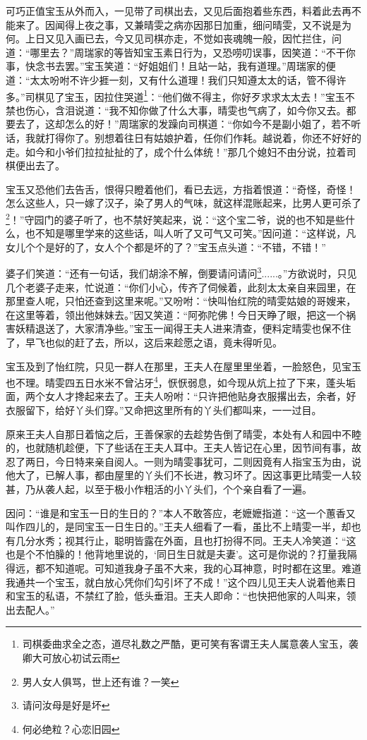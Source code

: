\documentclass[12pt,oneside]{book}
\begin{document}
可巧正值宝玉从外而入，一见带了司棋出去，又见后面抱着些东西，料着此去再不能来了。因闻得上夜之事，又兼晴雯之病亦因那日加重，细问晴雯，又不说是为何。上日又见入画已去，今又见司棋亦走，不觉如丧魂魄一般，因忙拦住，问道：“哪里去？”周瑞家的等皆知宝玉素日行为，又恐唠叨误事，因笑道：“不干你事，快念书去罢。”宝玉笑道：“好姐姐们！且站一站，我有道理。”周瑞家的便道：“太太吩咐不许少捱一刻，又有什么道理！我们只知遵太太的话，管不得许多。”司棋见了宝玉，因拉住哭道\footnote{司棋委曲求全之态，道尽礼数之严酷，更可笑有客谓王夫人属意袭人宝玉，袭卿大可放心初试云雨}：“他们做不得主，你好歹求求太太去！”宝玉不禁也伤心，含泪说道：“我不知你做了什么大事，晴雯也气病了，如今你又去。都要去了，这却怎么的好！”周瑞家的发躁向司棋道：“你如今不是副小姐了，若不听话，我就打得你了。别想着往日有姑娘护着，任你们作耗。越说着，你还不好好的走。如今和小爷们拉拉扯扯的了，成个什么体统！”那几个媳妇不由分说，拉着司棋便出去了。

宝玉又恐他们去告舌，恨得只瞪着他们，看已去远，方指着恨道：“奇怪，奇怪！怎么这些人，只一嫁了汉子，染了男人的气味，就这样混账起来，比男人更可杀了\footnote{男人女人俱骂，世上还有谁？一笑}！”守园门的婆子听了，也不禁好笑起来，说：“这个宝二爷，说的也不知是些什么，也不知是哪里学来的这些话，叫人听了又可气又可笑。”因问道：“这样说，凡女儿个个是好的了，女人个个都是坏的了？”宝玉点头道：“不错，不错！”

婆子们笑道：“还有一句话，我们胡涂不解，倒要请问请问\footnote{请问汝母是好是坏}......。”方欲说时，只见几个老婆子走来，忙说道：“你们小心，传齐了伺候着，此刻太太亲自来园里，在那里查人呢，只怕还查到这里来呢。”又吩咐：“快叫怡红院的晴雯姑娘的哥嫂来，在这里等着，领出他妹妹去。”因又笑道：“阿弥陀佛！今日天睁了眼，把这一个祸害妖精退送了，大家清净些。”宝玉一闻得王夫人进来清查，便料定晴雯也保不住了，早飞也似的赶了去，所以，这后来趁愿之语，竟未得听见。

宝玉及到了怡红院，只见一群人在那里，王夫人在屋里里坐着，一脸怒色，见宝玉也不理。晴雯四五日水米不曾沾牙\footnote{何必绝粒？心恋旧园}，恹恹弱息，如今现从炕上拉了下来，蓬头垢面，两个女人才搀起来去了。王夫人吩咐：“只许把他贴身衣服撂出去，余者，好衣服留下，给好丫头们穿。”又命把这里所有的丫头们都叫来，一一过目。

原来王夫人自那日着恼之后，王善保家的去趁势告倒了晴雯，本处有人和园中不睦的，也就随机趁便，下了些话在王夫人耳中。王夫人皆记在心里，因节间有事，故忍了两日，今日特来亲自阅人。一则为晴雯事犹可，二则因竟有人指宝玉为由，说他大了，已解人事，都由屋里的丫头们不长进，教习坏了。因这事更比晴雯一人较甚，乃从袭人起，以至于极小作粗活的小丫头们，个个亲自看了一遍。

因问：“谁是和宝玉一日的生日的？”本人不敢答应，老嬷嬷指道：“这一个蕙香又叫作四儿的，是同宝玉一日生日的。”王夫人细看了一看，虽比不上晴雯一半，却也有几分水秀；视其行止，聪明皆露在外面，且也打扮得不同。王夫人冷笑道：“这也是个不怕臊的！他背地里说的，‘同日生日就是夫妻’。这可是你说的？打量我隔得远，都不知道呢。可知道我身子虽不大来，我的心耳神意，时时都在这里。难道我通共一个宝玉，就白放心凭你们勾引坏了不成！”这个四儿见王夫人说着他素日和宝玉的私语，不禁红了脸，低头垂泪。王夫人即命：“也快把他家的人叫来，领出去配人。”
\end{document}
